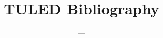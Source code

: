\documentclass [11pt,xetex]{article}
\title{TULED Bibliography}
\author{---}
\begin{document}
\maketitle
\nocite{*}

\printbibliography
\end{document}

